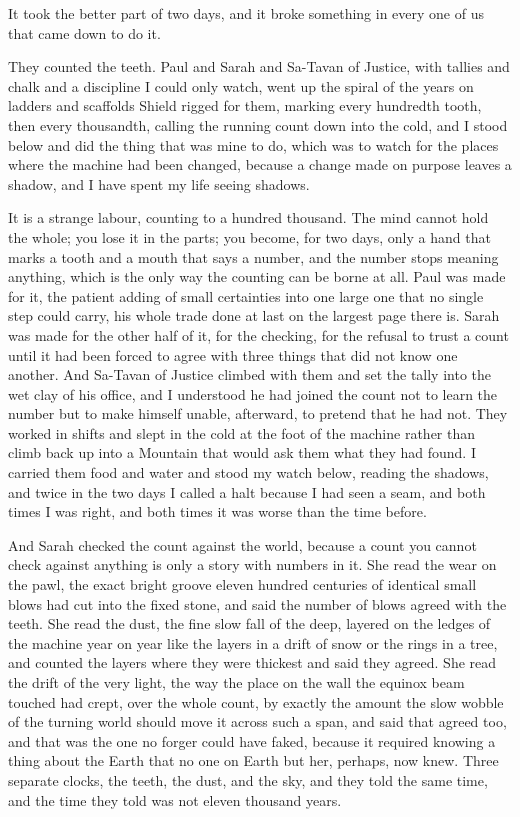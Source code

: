 \ornament

It took the better part of two days, and it broke something in every one of us that came down to do it.\par

They counted the teeth. Paul and Sarah and Sa-Tavan of Justice, with tallies and chalk and a discipline I could only watch, went up the spiral of the years on ladders and scaffolds Shield rigged for them, marking every hundredth tooth, then every thousandth, calling the running count down into the cold, and I stood below and did the thing that was mine to do, which was to watch for the places where the machine had been changed, because a change made on purpose leaves a shadow, and I have spent my life seeing shadows.\par

It is a strange labour, counting to a hundred thousand. The mind cannot hold the whole; you lose it in the parts; you become, for two days, only a hand that marks a tooth and a mouth that says a number, and the number stops meaning anything, which is the only way the counting can be borne at all. Paul was made for it, the patient adding of small certainties into one large one that no single step could carry, his whole trade done at last on the largest page there is. Sarah was made for the other half of it, for the checking, for the refusal to trust a count until it had been forced to agree with three things that did not know one another. And Sa-Tavan of Justice climbed with them and set the tally into the wet clay of his office, and I understood he had joined the count not to learn the number but to make himself unable, afterward, to pretend that he had not. They worked in shifts and slept in the cold at the foot of the machine rather than climb back up into a Mountain that would ask them what they had found. I carried them food and water and stood my watch below, reading the shadows, and twice in the two days I called a halt because I had seen a seam, and both times I was right, and both times it was worse than the time before.\par

And Sarah checked the count against the world, because a count you cannot check against anything is only a story with numbers in it. She read the wear on the pawl, the exact bright groove eleven hundred centuries of identical small blows had cut into the fixed stone, and said the number of blows agreed with the teeth. She read the dust, the fine slow fall of the deep, layered on the ledges of the machine year on year like the layers in a drift of snow or the rings in a tree, and counted the layers where they were thickest and said they agreed. She read the drift of the very light, the way the place on the wall the equinox beam touched had crept, over the whole count, by exactly the amount the slow wobble of the turning world should move it across such a span, and said that agreed too, and that was the one no forger could have faked, because it required knowing a thing about the Earth that no one on Earth but her, perhaps, now knew. Three separate clocks, the teeth, the dust, and the sky, and they told the same time, and the time they told was not eleven thousand years.\par

